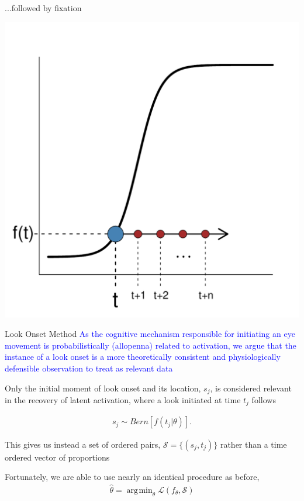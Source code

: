 \documentclass{beamer}
\DeclareMathOperator*{\argmin}{arg\!\min}
\newcommand{\vp}{\vspace{2mm}}
\providecommand{\cn}[1]{\textcolor{blue}{#1}}
\begin{document}
\begin{frame}{...followed by fixation}
\vspace{-5mm}
\begin{center}
\includegraphics[scale=0.4]{img/logistic_c.pdf}
\end{center}
\end{frame}

\begin{frame}{Look Onset Method}
\cn{As the cognitive mechanism responsible for initiating an eye movement is probabilistically (allopenna) related to activation, we argue that the instance of a look onset is a more theoretically consistent and physiologically defensible observation to treat as relevant data} \vp


Only the initial moment of look onset and its location, $s_j$, is considered relevant in the recovery of latent activation, where a look initiated at time $t_j$ follows
\vspace{-2mm}

\begin{align*}
s_j \sim Bern \left[f(t_j | \theta)\right].
\end{align*}

This gives us instead a set of ordered pairs, $\mathcal{S} = \{(s_j, t_j)\}$ rather than a time ordered vector of proportions  \vp

Fortunately, we are able to use nearly an identical procedure as before, 
\begin{align*}
\hat{\theta} = \argmin_{\theta} \mathcal{L}(f_{\theta}, \mathcal{S})
\end{align*}

\end{frame}
\end{document}
